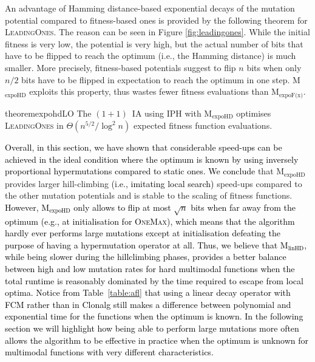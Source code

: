 \documentclass[lettersize,journal]{IEEEtran}
\newcommand{\new}[1]{\textcolor{black}{#1}}
\newcommand{\rerev}[1]{\textcolor{black}{#1}}
\newcommand{\oneoneIA}{$(1+1)$~IA}
\newcommand{\linHD}{M$_{\text{linHD}}$}
\newcommand{\expoF}{M$_{\text{expoF(x)}}$}
\newcommand{\expoHD}{M$_{\text{expoHD}}$}
\newcommand{\IPHfcm}{IPH}
\begin{document}
 

An advantage of Hamming distance-based exponential decays of the mutation potential
compared to fitness-based ones is provided by the following theorem for \textsc{LeadingOnes}.
The reason can be seen in Figure \ref{fig:leadingones}.  While the initial fitness is very low, the potential is very high, but the actual number of bits that have to be flipped to reach the optimum (i.e., the Hamming distance) is much smaller. More precisely, fitness-based potentials suggest to flip $n$ bits when only $n/2$ bits have to be flipped in expectation to reach the optimum in one step. 
{\expoHD } exploits this property, thus wastes fewer fitness evaluations than \expoF. 




\begin{restatable}{theorem}{expohdLO}\label{thm:expohdLO}
The {\oneoneIA } using \IPHfcm{} with {\expoHD } optimises
\textsc{LeadingOnes} in $\Theta(n^{5/2}/\log^2 n)$ expected fitness function
evaluations.
\end{restatable}



 \new{Overall, in this section, we have shown that considerable speed-ups can be achieved in the ideal condition where the optimum is known by using inversely proportional hypermutations compared to static ones.
We conclude} that {\expoHD } provides larger hill-climbing \rerev{(i.e., imitating local search)} speed-ups compared to the other mutation potentials and is stable to the scaling of fitness functions.
\new{However, {\expoHD } only allows to flip at most $\sqrt{n}$ bits when far away from the optimum (e.g., at initialisation for \textsc{OneMax}), which means that the algorithm hardly ever performs large mutations except at initialisation defeating the purpose of having a hypermutation operator at all. Thus, we believe that \linHD, while being slower during the hillclimbing phases, provides a better balance between high and low mutation rates for hard multimodal functions when the total runtime is reasonably dominated by the time required to escape from local optima. Notice from Table~\ref{table:afl} that using a linear decay operator with FCM  rather than in Clonalg still makes a difference between polynomial and exponential time for the functions when the optimum is known. In the following section we will highlight how being able to perform large mutations more often allows the algorithm to be effective in practice when the optimum is unknown for multimodal functions with very different characteristics.}
\end{document}
